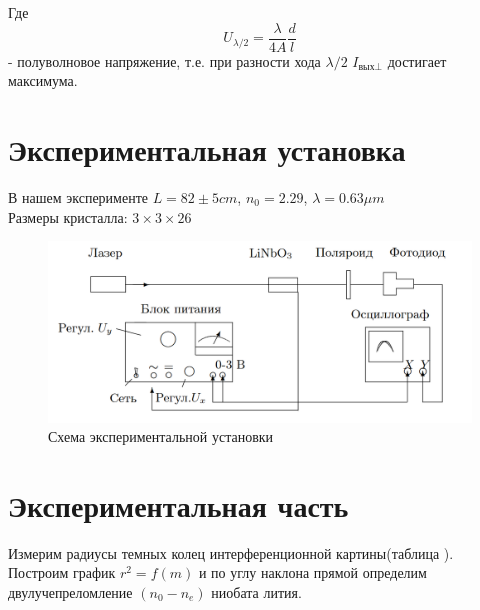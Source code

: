 \documentclass[a4paper,12pt]{article}
\begin{document}
	Где
	\begin{equation}\label{eq:half_lambda}
	U_{\lambda/2} = \frac{\lambda}{4A}\frac{d}{l}
	\end{equation} - полуволновое напряжение, т.е. при разности хода $\lambda/2$ $I_{\text{вых}\bot}$ достигает максимума.
	
	\section{Экспериментальная установка}
	
	В нашем эксперименте $L = 82 \pm 5 cm$, $n_0 = 2.29$, $\lambda = 0.63 \mu m$\\ Размеры кристалла: $3\times3\times26$
	
	\begin{figure}[h!]\label{fig:experiment}
		\begin{center}
			\includegraphics[width=0.8\linewidth]{experiment_scheme}
			\caption{Схема экспериментальной установки}
		\end{center}
	\end{figure}
	

	\section{Экспериментальная часть}
		
		Измерим радиусы темных колец интерференционной картины(таблица ). Построим график $r^2 = f(m)$ и по углу наклона прямой определим двулучепреломление $(n_0 - n_e)$ ниобата лития.
		
		\begin{table}[h!]\label{tab:radius}
			\centering
			\caption{Радиусы темных колец}
		\end{table}
		
\end{document}
